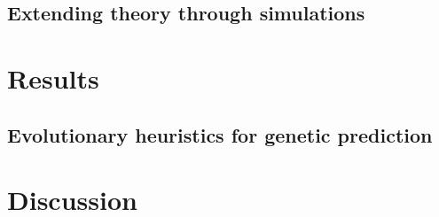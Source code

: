 \documentclass[10pt]{article}
\begin{document}
\subsection{Extending theory through simulations}


\section{Results}

\subsection{Evolutionary heuristics for genetic prediction}

\section{Discussion}
\end{document}
